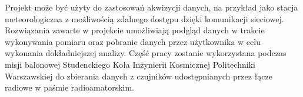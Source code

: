 Projekt może być użyty do zastosowań akwizycji danych, na przykład jako stacja meteorologiczna z możliwością zdalnego dostępu dzięki komunikacji sieciowej. Rozwiązania zawarte w projekcie umożliwiają podgląd danych w trakcie wykonywania pomiaru oraz pobranie danych przez użytkownika w celu wykonania dokładniejszej analizy. Część pracy zostanie wykorzystana podczas misji balonowej Studenckiego Koła Inżynierii Kosmicznej Politechniki Warszawskiej do zbierania danych z czujników udostępnianych przez łącze radiowe w paśmie radioamatorskim.
